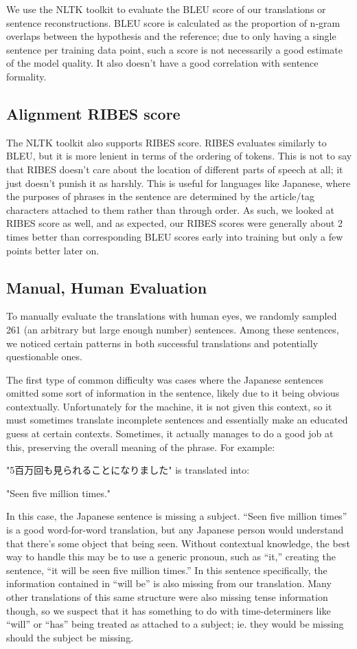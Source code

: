 \documentclass[11pt]{article}
\begin{document}
We use the NLTK toolkit \cite{NLTK} to evaluate the BLEU score of our translations or sentence reconstructions. BLEU score is calculated as the proportion of n-gram overlaps between the hypothesis and the reference; due to only having a single sentence per training data point, such a score is not necessarily a good estimate of the model quality. It also doesn't have a good correlation with sentence formality.

\subsection{Alignment RIBES score}

The NLTK toolkit \cite{NLTK} also supports RIBES score. RIBES evaluates similarly to BLEU, but it is more lenient in terms of the ordering of tokens. This is not to say that RIBES doesn't care about the location of different parts of speech at all; it just doesn't punish it as harshly. This is useful for languages like Japanese, where the purposes of phrases in the sentence are determined by the article/tag characters attached to them rather than through order. As such, we looked at RIBES score as well, and as expected, our RIBES scores were generally about 2 times better than corresponding BLEU scores early into training but only a few points better later on. 

\subsection{Manual, Human Evaluation}
To manually evaluate the translations with human eyes, we randomly sampled 261 (an arbitrary but large enough number) sentences. Among these sentences, we noticed certain patterns in both successful translations and potentially questionable ones. 

The first type of common difficulty was cases where the Japanese sentences omitted some sort of information in the sentence, likely due to it being obvious contextually. Unfortunately for the machine, it is not given this context, so it must sometimes translate incomplete sentences and essentially make an educated guess at certain contexts. Sometimes, it actually manages to do a good job at this, preserving the overall meaning of the phrase. For example: 

"5百万回も見られることになりました"  is translated into: 

"Seen five million times."

In this case, the Japanese sentence is missing a subject. “Seen five million times” is a good word-for-word translation, but any Japanese person would understand that there’s some object that being seen. Without contextual knowledge, the best way to handle this may be to use a generic pronoun, such as “it,” creating the sentence, “it will be seen five million times.” In this sentence specifically, the information contained in “will be” is also missing from our translation. Many other translations of this same structure were also missing tense information though, so we suspect that it has something to do with time-determiners like “will” or “has” being treated as attached to a subject; ie. they would be missing should the subject be missing.
\end{document}
